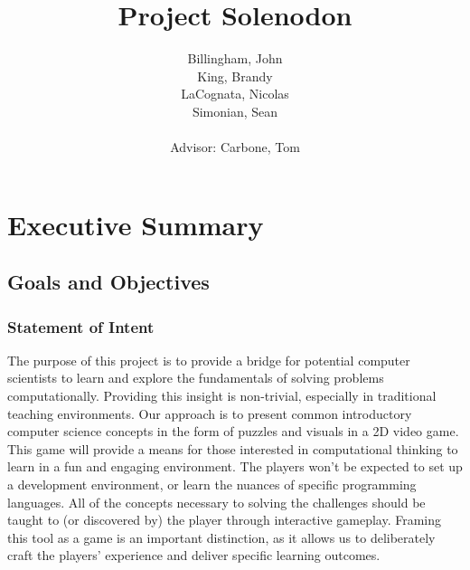 \documentclass{article}
\author{
  Billingham, John\\
  King, Brandy\\
  LaCognata, Nicolas\\
  Simonian, Sean\\\\
  {\small Advisor: Carbone, Tom}
}
\title{Project Solenodon}
\def\frontmatter{%
    \pagenumbering{roman}
    \setcounter{page}{1}
    \renewcommand{\thesection}{\Roman{section}}
}%
\def\mainmatter{%
    \pagenumbering{arabic}
    \setcounter{page}{1}
    \setcounter{section}{0}
    \renewcommand{\thesection}{\arabic{section}}
}%
\begin{document}
\frontmatter

\maketitle

\newpage
\tableofcontents

\newpage
\mainmatter
\section{Executive Summary}

\subsection{Goals and Objectives}

\subsubsection{Statement of Intent}
The purpose of this project is to provide a bridge for potential computer
scientists to learn and explore the fundamentals of solving problems
computationally. Providing this insight is non-trivial, especially in
traditional teaching environments. Our approach is to present common
introductory computer science concepts in the form of puzzles and visuals in a
2D video game. This game will provide a means for those interested in
computational thinking to learn in a fun and engaging environment. The players
won’t be expected to set up a development environment, or learn the nuances of
specific programming languages. All of the concepts necessary to solving the
challenges should be taught to (or discovered by) the player through interactive
gameplay. Framing this tool as a game is an important distinction, as it allows
us to deliberately craft the players’ experience and deliver specific learning
outcomes.\\
\end{document}
